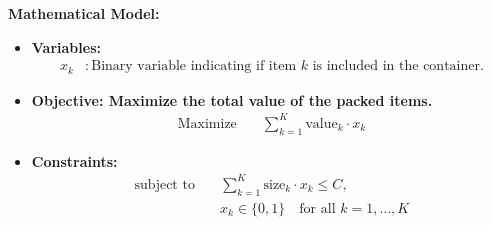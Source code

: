 \documentclass{article}
\begin{document}
\textbf{Mathematical Model:}

\begin{itemize}
    \item \textbf{Variables:}
    \begin{align*}
        x_k & : \text{Binary variable indicating if item $k$ is included in the container.}
    \end{align*}
    
    \item \textbf{Objective: Maximize the total value of the packed items.}
    \begin{align*}
        \text{Maximize} \quad & \sum_{k=1}^{K} \text{value}_{k} \cdot x_k
    \end{align*}
    
    \item \textbf{Constraints:}
    \begin{align*}
        \text{subject to} \quad & \sum_{k=1}^{K} \text{size}_{k} \cdot x_k \leq C, \\
        & x_k \in \{0, 1\} \quad \text{for all } k = 1, \ldots, K
    \end{align*}
\end{itemize}
\end{document}
